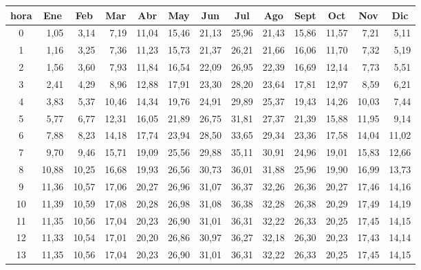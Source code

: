 \begin{table}[H]
\centering
\begin{tabular}{|c|r|r|r|r|r|r|r|r|r|r|r|r|}
\hline
hora &
  \multicolumn{1}{c|}{Ene} &
  \multicolumn{1}{c|}{Feb} &
  \multicolumn{1}{c|}{Mar} &
  \multicolumn{1}{c|}{Abr} &
  \multicolumn{1}{c|}{May} &
  \multicolumn{1}{c|}{Jun} &
  \multicolumn{1}{c|}{Jul} &
  \multicolumn{1}{c|}{Ago} &
  \multicolumn{1}{c|}{Sept} &
  \multicolumn{1}{c|}{Oct} &
  \multicolumn{1}{c|}{Nov} &
  \multicolumn{1}{c|}{Dic} \\ \hline
0  & 1,05  & 3,14  & 7,19  & 11,04 & 15,46 & 21,13 & 25,96 & 21,43 & 15,86 & 11,57 & 7,21  & 5,11  \\ \hline
1  & 1,16  & 3,25  & 7,36  & 11,23 & 15,73 & 21,37 & 26,21 & 21,66 & 16,06 & 11,70 & 7,32  & 5,19  \\ \hline
2  & 1,56  & 3,60  & 7,93  & 11,84 & 16,54 & 22,09 & 26,95 & 22,39 & 16,69 & 12,14 & 7,73  & 5,51  \\ \hline
3  & 2,41  & 4,29  & 8,96  & 12,88 & 17,91 & 23,30 & 28,20 & 23,64 & 17,81 & 12,97 & 8,59  & 6,21  \\ \hline
4  & 3,83  & 5,37  & 10,46 & 14,34 & 19,76 & 24,91 & 29,89 & 25,37 & 19,43 & 14,26 & 10,03 & 7,44  \\ \hline
5  & 5,77  & 6,77  & 12,31 & 16,05 & 21,89 & 26,75 & 31,81 & 27,37 & 21,39 & 15,88 & 11,95 & 9,14  \\ \hline
6  & 7,88  & 8,23  & 14,18 & 17,74 & 23,94 & 28,50 & 33,65 & 29,34 & 23,36 & 17,58 & 14,04 & 11,02 \\ \hline
7  & 9,70  & 9,46  & 15,71 & 19,09 & 25,56 & 29,88 & 35,11 & 30,91 & 24,96 & 19,01 & 15,83 & 12,66 \\ \hline
8  & 10,88 & 10,25 & 16,68 & 19,93 & 26,56 & 30,73 & 36,01 & 31,88 & 25,96 & 19,90 & 16,99 & 13,73 \\ \hline
9  & 11,36 & 10,57 & 17,06 & 20,27 & 26,96 & 31,07 & 36,37 & 32,26 & 26,36 & 20,27 & 17,46 & 14,16 \\ \hline
10 & 11,39 & 10,59 & 17,08 & 20,28 & 26,98 & 31,08 & 36,38 & 32,28 & 26,38 & 20,29 & 17,49 & 14,19 \\ \hline
11 & 11,35 & 10,56 & 17,04 & 20,23 & 26,90 & 31,01 & 36,31 & 32,22 & 26,33 & 20,25 & 17,45 & 14,15 \\ \hline
12 & 11,33 & 10,54 & 17,01 & 20,20 & 26,86 & 30,97 & 36,27 & 32,18 & 26,30 & 20,23 & 17,43 & 14,14 \\ \hline
13 & 11,35 & 10,56 & 17,04 & 20,23 & 26,90 & 31,01 & 36,31 & 32,22 & 26,33 & 20,25 & 17,45 & 14,15 \\ \hline

\end{tabular}
\end{table}
